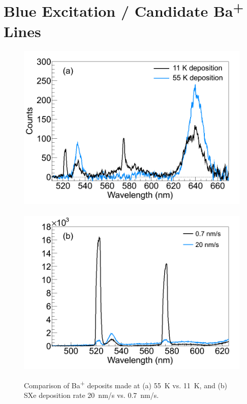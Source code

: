 
\section{Blue Excitation / Candidate Ba\textsuperscript{+} Lines}
\label{sec:BaPlus}


\begin{figure} %
        \centering
                \includegraphics[width=.5\textwidth]{figures/BaHx_a.png}
                ~
                \includegraphics[width=.5\textwidth]{figures/BaHx_b.png}
                \caption{Comparison of Ba\textsuperscript{+} deposits made at (a) 55~K vs. 11~K, and (b) SXe deposition rate 20~nm/s vs. 0.7~nm/s.\cite{Mong2015}}
\label{fig:BaHx}
\end{figure}

